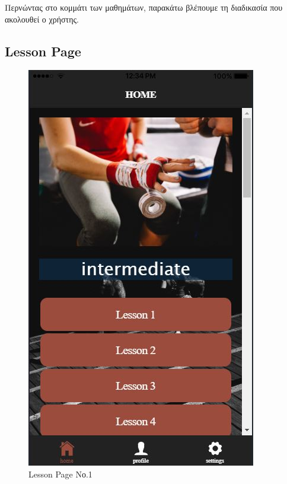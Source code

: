 \documentclass[a4paper,12pt]{article}
\begin{document}
			Περνώντας στο κομμάτι των μαθημάτων, παρακάτω βλέπουμε τη διαδικασία που ακολουθεί ο χρήστης.
			\subsection{Lesson Page}
			\clearpage
			\begin{figure}[!htb]
				\caption{Lesson Page Νο.1}
				\vspace*{0.5cm}

				  \includegraphics[width=\linewidth]{home2}
				  

\end{figure}
\end{document}
